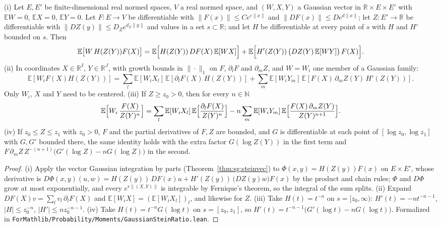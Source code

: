 \begin{lemma}\label{lem:sg-tal:perceptron-stein-ratio}
  \leanok
(i) Let $E,E'$ be finite-dimensional real normed spaces, $V$ a real normed space, and $(W,X,Y)$ a Gaussian vector in
$\mathbb R\times E\times E'$ with $\mathbb EW=0$, $\mathbb EX=0$, $\mathbb EY=0$. Let $F:E\to V$ be differentiable with
$\|F(x)\|\le Ce^{c\|x\|}$ and $\|DF(x)\|\le De^{d\|x\|}$; let $Z:E'\to\mathbb R$ be differentiable with
$\|DZ(y)\|\le D_Ze^{d_Z\|y\|}$ and values in a set $s\subset\mathbb R$; and let $H$ be differentiable at every point of $s$
with $H$ and $H'$ bounded on $s$. Then
\[
\mathbb E\bigl[W\,H(Z(Y))F(X)\bigr]
=\mathbb E\Bigl[H(Z(Y))\,DF(X)\,\mathbb E[WX]\Bigr]
 +\mathbb E\Bigl[H'(Z(Y))\,\bigl(DZ(Y)\,\mathbb E[WY]\bigr)\,F(X)\Bigr].
\]
(ii) In coordinates $X\in\mathbb R^{I}$, $Y\in\mathbb R^{J}$, with growth bounds in $\|\cdot\|_1$ on $F$,
$\partial_lF$ and $\partial_mZ$, and $W=W_i$ one member of a Gaussian family:
\[
\mathbb E[W_iF(X)H(Z(Y))]=\sum_l\mathbb E[W_iX_l]\,\mathbb E[\partial_lF(X)\,H(Z(Y))]
 +\sum_m\mathbb E[W_iY_m]\,\mathbb E[F(X)\,\partial_mZ(Y)\,H'(Z(Y))].
\]
Only $W_i$, $X$ and $Y$ need to be centered.
(iii) If $Z\ge z_0>0$, then for every $n\in\mathbb N$
\[
 \mathbb E\Bigl[W_i\,\frac{F(X)}{Z(Y)^n}\Bigr]=\sum_l\mathbb E[W_iX_l]\,\mathbb E\Bigl[\frac{\partial_lF(X)}{Z(Y)^n}\Bigr]
 -n\sum_m\mathbb E[W_iY_m]\,\mathbb E\Bigl[\frac{F(X)\,\partial_mZ(Y)}{Z(Y)^{n+1}}\Bigr].
\]
(iv) If $z_0\le Z\le z_1$ with $z_0>0$, $F$ and the partial derivatives of $F,Z$ are bounded, and $G$ is
differentiable at each point of $[\log z_0,\log z_1]$ with $G,G'$ bounded there, the same identity holds with the
extra factor $G(\log Z(Y))$ in the first term and
$F\,\partial_mZ\,Z^{-(n+1)}\bigl(G'(\log Z)-nG(\log Z)\bigr)$ in the second.
\end{lemma}
\begin{proof}
  \leanok
(i) Apply the vector Gaussian integration by parts (Theorem~\ref{thm:sg:steinvec}) to
$\Phi(x,y)=H(Z(y))F(x)$ on $E\times E'$, whose derivative is
$D\Phi(x,y)(u,w)=H(Z(y))\,DF(x)u+H'(Z(y))\,\bigl(DZ(y)w\bigr)F(x)$ by the product and chain rules; $\Phi$ and
$D\Phi$ grow at most exponentially, and every $e^{r\|(X,Y)\|}$ is integrable by Fernique's theorem, so the
integral of the sum splits. (ii) Expand $DF(X)v=\sum_lv_l\,\partial_lF(X)$ and
$\mathbb E[W_iX]=(\mathbb E[W_iX_l])_l$, and likewise for $Z$. (iii) Take $H(t)=t^{-n}$ on $s=[z_0,\infty)$:
$H'(t)=-nt^{-n-1}$, $|H|\le z_0^{-n}$, $|H'|\le nz_0^{-n-1}$. (iv) Take $H(t)=t^{-n}G(\log t)$ on $s=[z_0,z_1]$,
so $H'(t)=t^{-n-1}\bigl(G'(\log t)-nG(\log t)\bigr)$.
Formalized in \texttt{ForMathlib/Probability/Moments/GaussianSteinRatio.lean}.
\end{proof}

